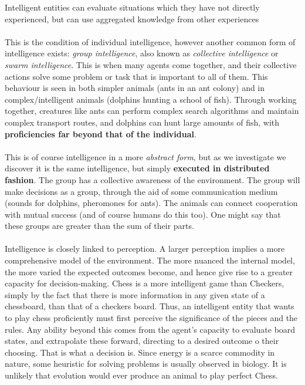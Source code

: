 \documentclass[10pt,a4paper]{article}
\begin{document}
				Intelligent entities can evaluate situations which they have not directly experienced, but can use aggregated knowledge from other experiences
				\\\\
				This is the condition of individual intelligence, however another common form of intelligence exists: \textsl{group intelligence}, also known as \textsl{collective intelligence} or \textsl{swarm intelligence}. This is when many agents come together, and their collective actions solve some problem or task that is important to all of them. This behaviour is seen in both simpler animals (ants in an ant colony) and in complex/intelligent animals (dolphins hunting a school of fish). Through working together, creatures like ants can perform complex search algorithms and maintain complex transport routes, and dolphins can hunt large amounts of fish, with \textbf{proficiencies far beyond that of the individual}. 
				\\\\
				This is of course intelligence in a more \textsl{abstract form}, but as we investigate we discover it is the same intelligence, but simply \textbf{executed in distributed fashion}. The group has a collective awareness of the environment. The group will make decisions as a group, through the aid of some communication medium (sounds for dolphins, pheromones for ants). The animals can connect cooperation with mutual success (and of course humans do this too). One might say that these groups are greater than the sum of their parts.
				\\\\
				Intelligence is closely linked to perception. A larger perception implies a more comprehensive model of the environment. The more nuanced the internal model, the more varied the expected outcomes become, and hence give rise to a greater capacity for decision-making. Chess is a more intelligent game than Checkers, simply by the fact that there is more information in any given state of a chessboard, than that of a checkers board. Thus, an intelligent entity that wants to play chess proficiently must first perceive the significance of the pieces and the rules. Any ability beyond this comes from the agent's capacity to evaluate board states, and extrapolate these forward, directing to a desired outcome o their choosing. That is what a decision is. Since energy is a scarce commodity in nature, some heuristic for solving problems is usually observed in biology. It is unlikely that evolution would ever produce an animal to play perfect Chess.
\end{document}
